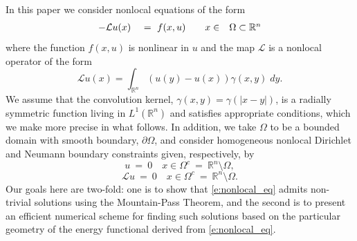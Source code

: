 \documentclass[11pt]{amsart}   	%
\theoremstyle{plain}
\numberwithin{equation}{section}
\def\R{\mathbb{R}}
\begin{document}
In this paper we consider nonlocal equations of the form
\begin{equation}\label{e:nonlocal_eq}
\begin{array}{c c c c }
-\mathcal{L} u(x) \ & = \ f(x,u) & \quad  x \in & \Omega \subset \mathbb{R}^n \\ %
\end{array}
\end{equation}
where the function $f(x,u)$ is nonlinear in $u$ and the map $\mathcal{L}$ is a nonlocal operator of the form
\begin{equation}\label{e:conv_operator}
\mathcal{L} u(x) = \int_{\R^n} (u(y) - u(x) ) \gamma(x,y) \; dy.
\end{equation}
We assume that the convolution kernel,  $\gamma(x,y) = \gamma(|x-y|)$, is a radially symmetric function living in $L^1(\R^n)$ and satisfies appropriate conditions, which we make more precise in what follows. In addition, we take $\Omega$ to be a bounded domain with smooth boundary, $\partial \Omega$, and consider homogeneous nonlocal Dirichlet and Neumann boundary constraints given, respectively, by
\begin{equation}\label{e:dirichlet}
u \ = \ 0 \quad x \in \Omega^c \ = \ \mathbb{R}^n \setminus \Omega, %
\end{equation}
\begin{equation}\label{e:neumann}
\mathcal{L} u \ = \ 0 \quad x \in \Omega^c \ = \ \mathbb{R}^n \setminus \Omega.
\end{equation}
Our goals here are two-fold: one is to show that \eqref{e:nonlocal_eq} admits non-trivial solutions using the Mountain-Pass Theorem,  and the second is to present an efficient numerical scheme for finding such solutions based on the particular geometry of the energy functional derived from \eqref{e:nonlocal_eq}.
\end{document}
